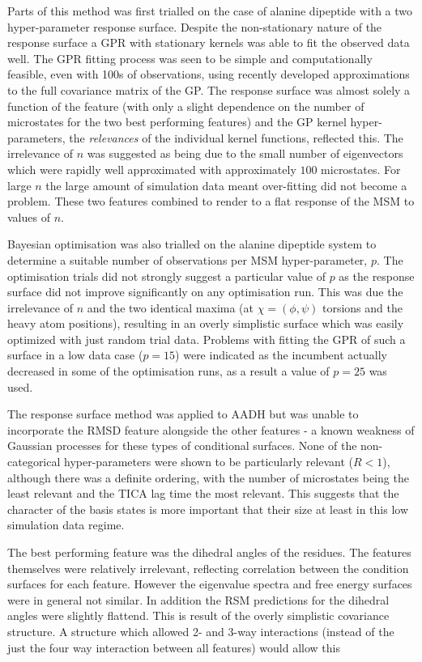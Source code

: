 Parts of this method was first trialled on the case of alanine dipeptide with a two hyper-parameter response surface. Despite the non-stationary nature of the response surface a GPR with stationary kernels was able to fit the observed data well. The GPR fitting process was seen to be simple and computationally feasible, even with 100s of observations, using recently developed approximations to the full covariance matrix of the GP. The response surface was almost solely a function of the feature (with only a slight dependence on the number of microstates for the two best performing features) and the GP kernel hyper-parameters, the \emph{relevances} of the individual kernel functions, reflected this. The irrelevance of $n$ was suggested as being due to the small number of eigenvectors which were rapidly well approximated with approximately $100$ microstates. For large $n$ the large amount of simulation data meant over-fitting did not become a problem. These two features combined to render to a flat response of the MSM to values of $n$. 

Bayesian optimisation was also trialled on the alanine dipeptide system to determine a suitable number of observations per MSM hyper-parameter, $p$. The optimisation trials did not strongly suggest a particular value of $p$ as the response surface did not improve significantly on any optimisation run. This was due the irrelevance of $n$ and the two identical maxima (at $\chi=(\phi, \psi)$ torsions and the heavy atom positions),  resulting in an overly simplistic surface which was easily optimized with just random trial data. Problems with fitting the GPR of such a surface in a low data case ($p=15$) were indicated as the incumbent actually decreased in some of the optimisation runs, as a result a value of $p=25$ was used. 

The response surface method was applied to AADH but was unable to incorporate the RMSD feature alongside the other features - a known weakness of Gaussian processes for these types of conditional surfaces. None of the non-categorical hyper-parameters were shown to be particularly relevant ($R < 1$), although there was a definite ordering, with the number of microstates being the least relevant and the TICA lag time the most relevant. This suggests that the character of the basis states is more important that their size at least in this low simulation data regime. 

The best performing feature was the dihedral angles of the residues. The features themselves were relatively irrelevant, reflecting correlation between the condition surfaces for each feature. However the eigenvalue spectra and free energy surfaces were in general not similar. In addition the RSM predictions for the dihedral angles were slightly flattend.  This  is result of the overly simplistic covariance structure. A structure which allowed 2- and 3-way interactions (instead of the just the four way interaction between all features) would allow this 






